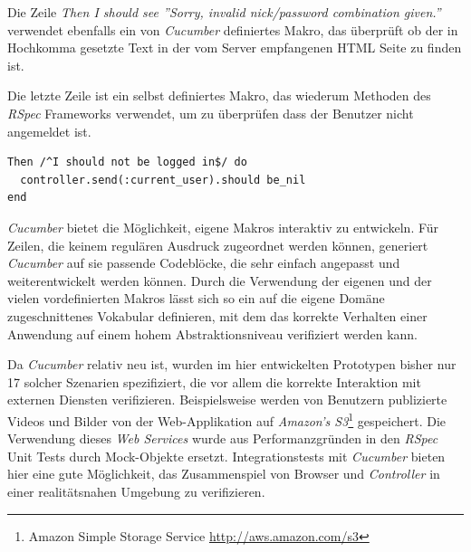 Die Zeile \textit{Then I should see ''Sorry, invalid nick/password
  combination given.''} verwendet ebenfalls ein von \textit{Cucumber}
definiertes Makro, das überprüft ob der in Hochkomma gesetzte Text in
der vom Server empfangenen HTML Seite zu finden ist.

Die letzte Zeile ist ein selbst definiertes Makro, das wiederum
Methoden des \textit{RSpec} Frameworks verwendet, um zu überprüfen dass der
Benutzer nicht angemeldet ist.

\begin{lstlisting}
Then /^I should not be logged in$/ do
  controller.send(:current_user).should be_nil
end
\end{lstlisting}

\textit{Cucumber} bietet die Möglichkeit, eigene Makros interaktiv zu
entwickeln. Für Zeilen, die keinem regulären Ausdruck zugeordnet
werden können, generiert \textit{Cucumber} auf sie passende Codeblöcke, die
sehr einfach angepasst und weiterentwickelt werden können. Durch die
Verwendung der eigenen und der vielen vordefinierten Makros lässt sich
so ein auf die eigene Domäne zugeschnittenes Vokabular definieren, mit
dem das korrekte Verhalten einer Anwendung auf einem hohem
Abstraktionsniveau verifiziert werden kann.

Da \textit{Cucumber} relativ neu ist, wurden im hier entwickelten
Prototypen bisher nur 17 solcher Szenarien spezifiziert, die vor allem
die korrekte Interaktion mit externen Diensten
verifizieren. Beispielsweise werden von Benutzern publizierte Videos
und Bilder von der Web-Applikation auf \textit{Amazon's
  S3}\footnote{Amazon Simple Storage Service
  \url{http://aws.amazon.com/s3}} gespeichert. Die Verwendung dieses
\textit{Web Services} wurde aus Performanzgründen in den
\textit{RSpec} Unit Tests durch Mock-Objekte
ersetzt. Integrationstests mit \textit{Cucumber} bieten hier eine gute
Möglichkeit, das Zusammenspiel von Browser und \textit{Controller} in
einer realitätsnahen Umgebung zu verifizieren.

